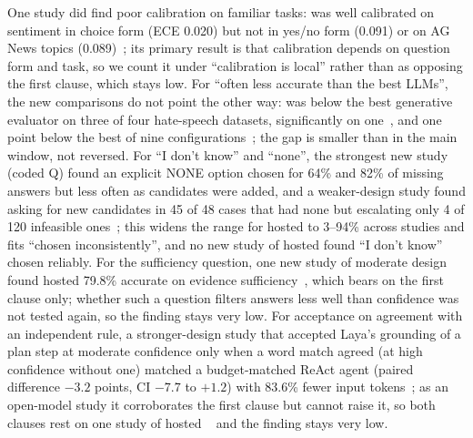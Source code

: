 One study did find poor calibration on familiar tasks: \jev{} was well calibrated on sentiment in choice form (ECE 0.020) but not in yes/no form (0.091) or on AG News topics (0.089)~\cite{zen22935043}\zmark{}; its primary result is that calibration depends on question form and task, so we count it under ``calibration is local'' rather than as opposing the first clause, which stays low.
For ``often less accurate than the best LLMs'', the new comparisons do not point the other way: \jev{} was below the best generative evaluator on three of four hate-speech datasets, significantly on one~\cite{arx03324}, and one point below the best of nine configurations~\cite{arx03935}; the gap is smaller than in the main window, not reversed.
For ``I don't know'' and ``none'', the strongest new study~\cite{arx03387} (coded Q) found an explicit NONE option chosen for 64\% and 82\% of missing answers but less often as candidates were added, and a weaker-design study found \jev{} asking for new candidates in 45 of 48 cases that had none but escalating only 4 of 120 infeasible ones~\cite{arx06425}; this widens the range for hosted \jev{} to 3--94\% across studies and fits ``chosen inconsistently'', and no new study of hosted \jev{} found ``I don't know'' chosen reliably.
For the sufficiency question, one new study of moderate design found hosted \jev{} 79.8\% accurate on evidence sufficiency~\cite{arx05107}, which bears on the first clause only; whether such a question filters answers less well than confidence was not tested again, so the finding stays very low.
For acceptance on agreement with an independent rule, a stronger-design study that accepted Laya's grounding of a plan step at moderate confidence only when a word match agreed (at high confidence without one) matched a budget-matched ReAct agent (paired difference $-3.2$ points, CI $-7.7$ to $+1.2$) with 83.6\% fewer input tokens~\cite{zen22904595}\zmark{}; as an open-model study it corroborates the first clause but cannot raise it, so both clauses rest on one study of hosted \jev{}~\cite{arx02048} and the finding stays very low.
